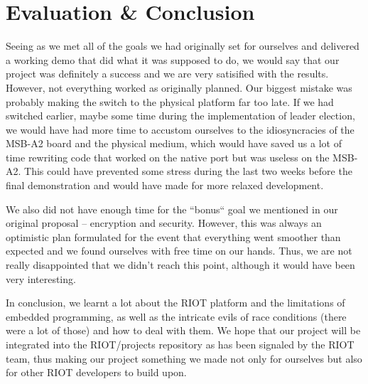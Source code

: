 \documentclass[11pt,
  a4paper,
  ngerman,
  BCOR=7mm
]{scrartcl}
\begin{document}
\section*{Evaluation \& Conclusion}
\label{sec:evaluation_conclusion}
Seeing as we met all of the goals we had originally set for ourselves
and delivered a working demo that did what it was supposed to do, we
would say that our project was definitely a success and we are very
satisified with the results. However, not everything worked as
originally planned. Our biggest mistake was probably making the switch
to the physical platform far too late. If we had switched earlier, maybe
some time during the implementation of leader election, we would have
had more time to accustom ourselves to the idiosyncracies of the MSB-A2
board and the physical medium, which would have saved us a lot of time
rewriting code that worked on the native port but was useless on the
MSB-A2. This could have prevented some stress during the last two weeks
before the final demonstration and would have made for more relaxed
development.

We also did not have enough time for the ``bonus`` goal we mentioned in
our original proposal -- encryption and security. However, this was
always an optimistic plan formulated for the event that everything went
smoother than expected and we found ourselves with free time on our
hands. Thus, we are not really disappointed that we didn't reach this
point, although it would have been very interesting.

In conclusion, we learnt a lot about the RIOT platform and the
limitations of embedded programming, as well as the intricate evils of
race conditions (there were a lot of those) and how to deal with them.
We hope that our project will be integrated into the RIOT/projects
repository as has been signaled by the RIOT team, thus making our
project something we made not only for ourselves but also for other RIOT
developers to build upon.
\end{document}
